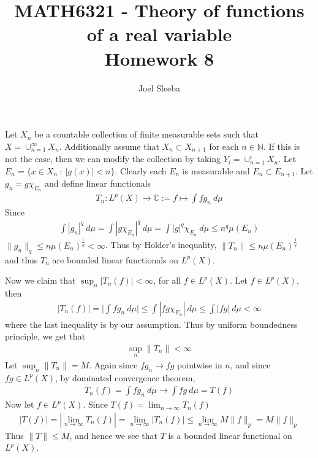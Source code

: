 \documentclass[12pt]{exam}
\theoremstyle{plain} %
\theoremstyle{definition} %
\theoremstyle{remark} %
\begin{document}
\title{MATH6321 - Theory of functions of a real variable \\ Homework 8}

\author{
  Joel Sleeba \\
}

\maketitle
\printanswers
\unframedsolutions

\begin{questions}

  \question
  \begin{solution}
    Let $X_n$ be a countable collection of finite measurable sets
    such that $X = \cup_{n = 1}^{\infty} X_n$. Additionally assume
    that $X_n \subset X_{n + 1}$ for each $n \in \mathbb{N}$. If this
    is not the case, then we can modify the collection by taking $Y_i
    = \cup_{n = 1}^{i}X_n$. Let $E_n = \{ x \in X_n \ : \ |g(x)|< n
    \}$. Clearly each $ E_n$ is measurable and $E_n \subset E_{n +
    1}$. Let $g_n = g \chi_{E_n}$ and define linear functionals
    \begin{align*}
      T_n : L^{p}(X) \to \mathbb{C} := f \mapsto \int fg_n \ d \mu
    \end{align*}
    Since
    \begin{align*}
      \int |g_n|^q \ d \mu = \int |g \chi_{E_n}|^q \ d \mu = \int
      |g|^q \chi_{E_n} \ d \mu \le  n^q \mu(E_n)
    \end{align*}
    $\|g_n\|_q \le n \mu(E_n)^{\frac{1}{q}} < \infty$. Thus by
    Holder's inequality, $\|T_n\| \le n \mu(E_n)^{\frac{1}{q}}$ and
    thus $T_n$ are bounded linear functionals on $L^{p}(X)$.

    Now we claim that $\sup_{n} |T_n(f)| < \infty$, for all $ f \in
    L^{p}(X)$. Let $ f  \in L^{p}(X)$, then
    \begin{align*}
      |T_n(f)| = \Bigg| \int fg_n \ d \mu \Big| \le \int  |fg
      \chi_{E_n}| \ d \mu \le \int |fg| \ d \mu < \infty
    \end{align*}
    where the last inequality is by our assumption. Thus by uniform
    boundedness principle, we get that
    \begin{align*}
      \sup_{n} \|T_n\| < \infty
    \end{align*}
    Let $\sup_{n} \|T_n\| = M$. Again since $fg_n \to fg$ pointwise
    in $n$, and since $ fg \in L^{p}(X)$, by dominated convergence theorem,
    \begin{align*}
      T_n(f) = \int fg_n \ d \mu \to \int fg \ d \mu = T(f)
    \end{align*}
    Now let $ f \in L^{p}(X)$. Since $T(f) = \lim_{n \to \infty} T_n(f)$
    \begin{align*}
      |T(f)| = |\lim_{n \to \infty} T_n(f)| = \lim_{n \to \infty}
      |T_n(f)| \le \lim_{n \to \infty}  M \|f\|_p = M \|f\|_p
    \end{align*}
    Thus $\|T\| \le M$, and hence we see that $T$ is a bounded linear
    functional on $L^{p}(X)$.


\end{solution}
\end{questions}
\end{document}
